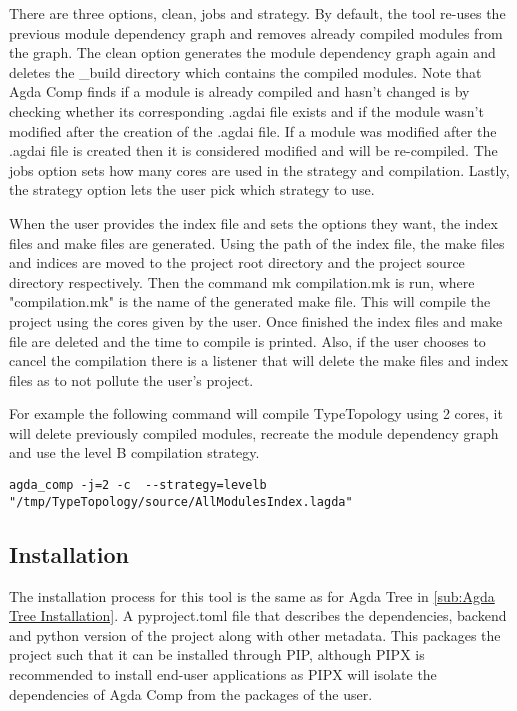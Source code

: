 
There are three options, clean, jobs and strategy. By default, the tool re-uses
the previous module dependency graph and removes already compiled modules from
the graph. The clean option generates the module dependency graph again and
deletes the \_build directory which contains the compiled modules. Note that
Agda Comp finds if a module is already compiled and hasn't changed is by
checking whether its corresponding .agdai file exists and if the module wasn't
modified after the creation of the .agdai file. If a module was modified after
the .agdai file is created then it is considered modified and will be
re-compiled. The jobs option sets how many cores are used in the strategy and
compilation. Lastly, the strategy option lets the user pick which strategy to
use.


When the user provides the index file and sets the options they want, the index
files and make files are generated. Using the path of the index file, the make
files and indices are moved to the project root directory and the project
source directory respectively. Then the command \textsf{mk compilation.mk} is
run, where "compilation.mk" is the name of the generated make file. This will
compile the project using the cores given by the user. Once finished the
index files and make file are deleted and the time to compile is printed. Also,
if the user chooses to cancel the compilation there is a listener that will
delete the make files and index files as to not pollute the user's project.

For example the following command will compile TypeTopology using 2 cores, it
will delete previously compiled modules, recreate the module dependency graph
and use the level B compilation strategy.

\begin{lstlisting}
agda_comp -j=2 -c  --strategy=levelb "/tmp/TypeTopology/source/AllModulesIndex.lagda"
\end{lstlisting}

\subsection{Installation}

The installation process for this tool is the same as for Agda Tree in 
\cref{sub:Agda Tree Installation}. A pyproject.toml file that describes
the dependencies, backend and python version of the project along with
other metadata. This packages the project such that it can be installed through
PIP, although PIPX is recommended to install end-user applications as PIPX will
isolate the dependencies of Agda Comp from the packages of the user.

